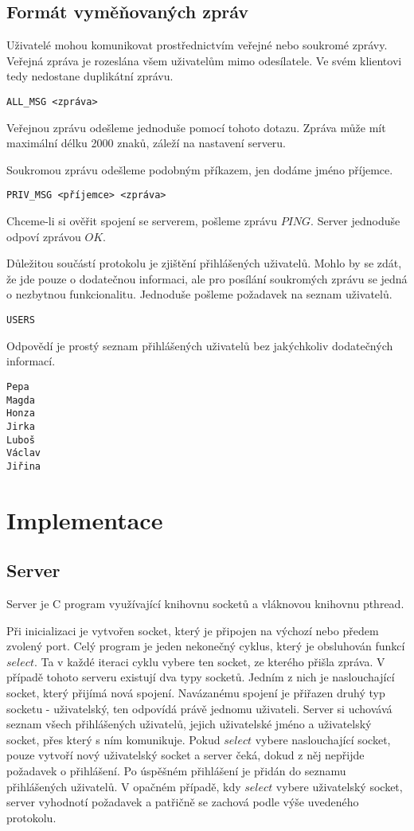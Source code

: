 \documentclass[12pt,titlepage]{article}
\begin{document}
\subsection{Formát vyměňovaných zpráv}
Uživatelé mohou komunikovat prostřednictvím veřejné nebo soukromé zprávy.
Veřejná zpráva je rozeslána všem uživatelům mimo odesílatele. Ve svém klientovi
tedy nedostane duplikátní zprávu.
\begin{verbatim}
ALL_MSG <zpráva>
\end{verbatim}
Veřejnou zprávu odešleme jednoduše pomocí tohoto dotazu. Zpráva může mít
maximální délku 2000 znaků, záleží na nastavení serveru.

Soukromou zprávu odešleme podobným příkazem, jen dodáme jméno příjemce.
\begin{verbatim}
PRIV_MSG <příjemce> <zpráva>
\end{verbatim}

Chceme-li si ověřit spojení se serverem, pošleme zprávu $PING$. Server jednoduše
odpoví zprávou $OK$.

Důležitou součástí protokolu je zjištění přihlášených uživatelů. Mohlo by se
zdát, že jde pouze o dodatečnou informaci, ale pro posílání soukromých zprávu
se jedná o nezbytnou funkcionalitu. Jednoduše pošleme požadavek na seznam uživatelů.

\begin{verbatim}
USERS
\end{verbatim}

Odpovědí je prostý seznam přihlášených uživatelů bez jakýchkoliv dodatečných
informací.
\begin{verbatim}
Pepa
Magda
Honza
Jirka
Luboš
Václav
Jiřina
\end{verbatim}

\section{Implementace}
\subsection{Server}
Server je C program využívající knihovnu socketů a vláknovou knihovnu pthread. 

Při inicializaci je vytvořen socket, který je připojen na výchozí nebo předem
zvolený port. Celý program je jeden nekonečný cyklus, který je obsluhován
funkcí $select$. Ta v každé iteraci cyklu vybere ten socket, ze kterého přišla
zpráva. V případě tohoto serveru existují dva typy socketů. Jedním z nich je
naslouchající socket, který přijímá nová spojení. Navázanému spojení je
přiřazen druhý typ socketu - uživatelský, ten odpovídá právě jednomu uživateli.
Server si uchovává seznam všech přihlášených uživatelů, jejich uživatelské
jméno a uživatelský socket, přes který s ním komunikuje. Pokud $select$ vybere
naslouchající socket, pouze vytvoří nový uživatelský socket a server čeká,
dokud z něj nepřijde požadavek o přihlášení. Po úspěšném přihlášení je přidán
do seznamu přihlášených uživatelů. V opačném případě, kdy $select$ vybere
uživatelský socket, server vyhodnotí požadavek a patřičně se zachová podle výše
uvedeného protokolu.
\end{document}
